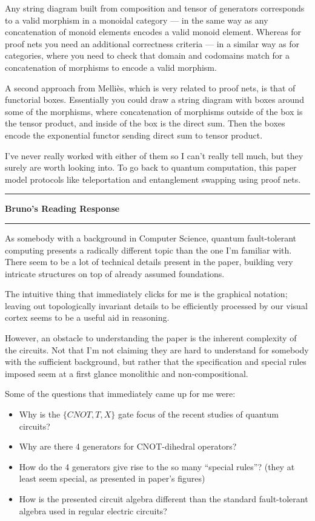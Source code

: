 \documentclass{amsart}
\newcommand{\iam}[1]{
  \vspace{0.25em}
  \hrule
  \vspace{0.25em}
  \textbf{{#1}'s Reading Response}
  \vspace{0.25em}
  \hrule
  \vspace{1em}
}
\begin{document}
Any string diagram built from composition and tensor of generators corresponds to a valid morphism in a monoidal category --- in the same way as any concatenation of monoid elements encodes a valid monoid element. Whereas for proof nets you need an additional correctness criteria --- in a similar way as for categories, where you need to check that domain and codomains match for a concatenation of morphisms to encode a valid morphism.

A second approach from Melliès, which is very related to proof nets, is that of functorial boxes. Essentially you could draw a string diagram with boxes around some of the morphisms, where concatenation of morphisms outside of the box is the tensor product, and inside of the box is the direct sum. Then the boxes encode the exponential functor sending direct sum to tensor product.

I've never really worked with either of them so I can't really tell much, but they surely are worth looking into. To go back to quantum computation, this paper \cite{AbramskyDuncan06} model protocols like teleportation and entanglement swapping using proof nets.
\\

\iam{Bruno}

As somebody with a background in Computer Science, quantum fault-tolerant
computing presents a radically different topic than the one I'm familiar with.
There seem to be a lot of technical details present in the paper, building very
intricate structures on top of already assumed foundations.

The intuitive thing that immediately clicks for me is the graphical notation; leaving out
topologically invariant details to be efficiently processed by our visual cortex
seems to be a useful aid in reasoning.

However, an obstacle to understanding the paper is the inherent complexity of the circuits. Not that I'm not claiming they are hard to understand for somebody with the sufficient background, but rather that the specification and special rules imposed seem at a first glance monolithic and non-compositional.

Some of the questions that immediately came up for me were:
\begin{itemize}
\item Why is the $\{CNOT,T, X\}$ gate focus of the recent studies of quantum circuits?
\item Why are there 4 generators for CNOT-dihedral operators?
\item How do the 4 generators give rise to the so many ``special rules''? (they
  at least seem special, as presented in paper's figures)
\item How is the presented circuit algebra different than the standard
  fault-tolerant algebra used in regular electric circuits?

\end{itemize}
\end{document}
